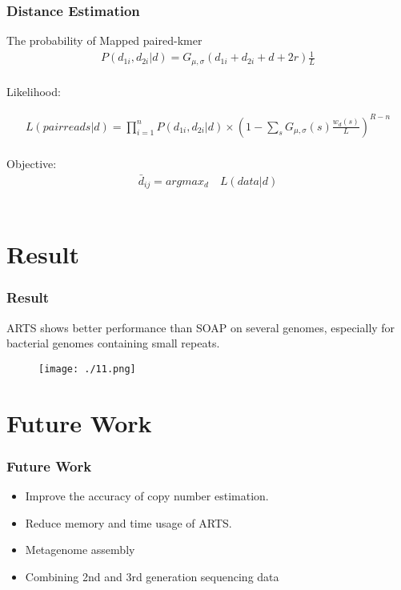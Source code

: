 \documentclass[mathserif]{beamer}
\begin{document}
		\begin{frame}
    			\frametitle{Distance Estimation}
    				
    				The probability of Mapped paired-kmer\\
    						\begin{eqnarray}
   							 P(d_{1i},d_{2i}|d)=G_{\mu ,\sigma}(d_{1i} + d_{2i} + d + 2r)\frac{1}{L}
    						\end{eqnarray}\\
    				Likelihood:    				
    				
    						\begin{eqnarray}
   							 L(pair reads|d)=\prod_{i=1}^{n}P(d_{1i},d_{2i}|d)\times(1-\sum _{s}G_{\mu , \sigma}(s)\frac{w_d(s)}{L})^{R-n}
    						\end{eqnarray}\\
    				Objective:\\
    						\begin{eqnarray}
    							\bar{d}_{ij} = argmax _d \quad L(data|d)
    						\end{eqnarray}\\
    				
    				
    		\end{frame}
		
	\section{Result}
		\begin{frame}
			\frametitle{Result}
			ARTS shows better performance than SOAP on several genomes, especially for bacterial genomes containing small repeats.
			\begin{figure}
				\centering
				\texttt{[image: ./11.png]}
			\end{figure}
		\end{frame}

	\section{Future Work}
		\begin{frame} 
			\frametitle{Future Work}
			\begin{itemize}
				\item Improve the accuracy of copy number estimation. 	
				\item Reduce memory and time usage of ARTS.
				\item Metagenome assembly
				\item Combining 2nd and 3rd generation sequencing data 
			\end{itemize}	
		\end{frame}
\end{document}
